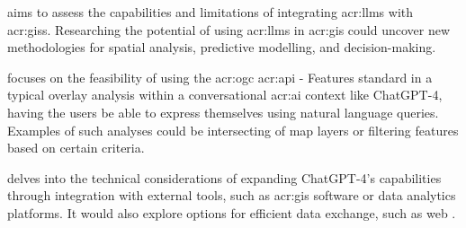  aims to assess the capabilities and limitations of integrating \glspl{acr:llm} with \glspl{acr:gis}. Researching the potential of using \glspl{acr:llm} in \gls{acr:gis} could uncover new methodologies for spatial analysis, predictive modelling, and decision-making.

 focuses on the feasibility of using the \acrshort{acr:ogc} \acrshort{acr:api} - Features standard in a typical overlay analysis within a conversational \acrshort{acr:ai} context like ChatGPT-4, having the users be able to express themselves using natural language queries. Examples of such analyses could be intersecting of map layers or filtering features based on certain criteria.

 delves into the technical considerations of expanding ChatGPT-4's capabilities through integration with external tools, such as \acrshort{acr:gis} software or data analytics platforms. It would also explore options for efficient data exchange, such as web .

